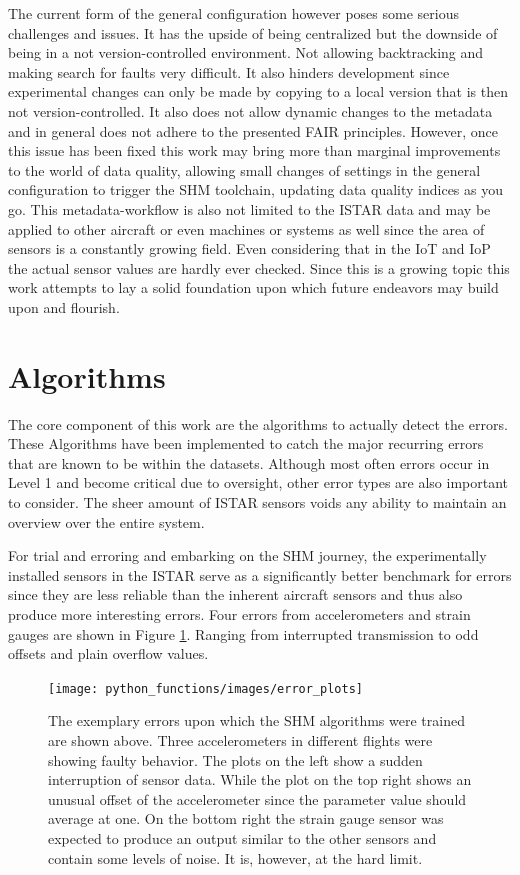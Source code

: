 The current form of the general configuration however poses some serious challenges and issues. It has the upside of being centralized but the downside of being in a not version-controlled environment. Not allowing backtracking and making search for faults very difficult. It also hinders development since experimental changes can only be made by copying to a local version that is then not version-controlled. It also does not allow dynamic changes to the metadata and in general does not adhere to the presented FAIR principles. However, once this issue has been fixed this work may bring more than marginal improvements to the world of data quality, allowing small changes of settings in the general configuration to trigger the SHM toolchain, updating data quality indices as you go. This metadata-workflow is also not limited to the  ISTAR data and may be applied to other aircraft or even machines or systems as well since the area of sensors is a constantly growing field. Even considering that in the IoT and IoP \cite{pennekamp_towards_2019} the actual sensor values are hardly ever checked. Since this is a growing topic this work attempts to lay a solid foundation upon which future endeavors may build upon and flourish.


\section{Algorithms}

The core component of this work are the algorithms to actually detect the errors. These Algorithms have been implemented to catch the major recurring errors that are known to be within the datasets. Although most often errors occur in Level 1 and become critical due to oversight, other error types are also important to consider. The sheer amount of ISTAR sensors voids any ability to maintain an overview over the entire system.

For trial and erroring and embarking on the SHM journey, the experimentally installed sensors in the ISTAR serve as a significantly better benchmark for errors since they are less reliable than the inherent aircraft sensors and thus also produce more interesting errors. Four errors from accelerometers and strain gauges are shown in Figure \ref{fig:error_plots}. Ranging from interrupted transmission to odd offsets and plain overflow values.

\begin{figure}[h]
    \centering
    \texttt{[image: python\_functions/images/error\_plots]}
    \caption[Errors upon which the algorithms are trained]{The exemplary errors upon which the SHM algorithms were trained are shown above. Three accelerometers in different flights were showing faulty behavior. The plots on the left show a sudden interruption of sensor data. While the plot on the top right shows an unusual offset of the accelerometer since the parameter value should average at one. On the bottom right the strain gauge sensor was expected to produce an output similar to the other sensors and contain some levels of noise. It is, however, at the hard limit.}
    \label{fig:error_plots}
\end{figure}


